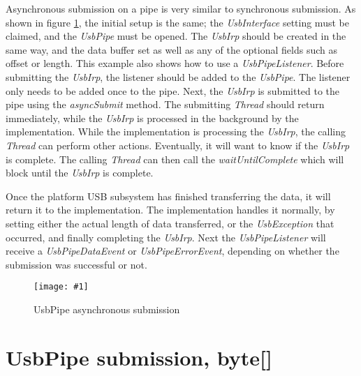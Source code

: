 \documentclass{article}
\newcommand{\myclass}[1]{\emph{#1}}
\newcommand{\myinterface}[1]{\emph{#1}}
\newcommand{\mymethod}[1]{\emph{#1}}
\newcommand{\mysectionend}[0]{\vfill\pagebreak[1]}
\newcommand{\myfigure}[3]{\begin{figure}[htbp]\centering\texttt{[image: \#1]}\caption{#2}\label{#3}\end{figure}}
\begin{document}
Asynchronous submission on a pipe is very similar to synchronous submission.
As shown in figure \ref{UsbPipeAsync}, the initial setup is the same; the
\myinterface{UsbInterface} setting must be claimed, and the \myinterface{UsbPipe} must be opened.  The
\myinterface{UsbIrp} should be created in the same way, and the data buffer set as well
as any of the optional fields such as offset or length.  This example also
shows how to use a \myinterface{UsbPipeListener}.  Before submitting the \myinterface{UsbIrp}, the
listener should be added to the \myinterface{UsbPipe}.  The listener only needs to be added
once to the pipe.  Next, the \myinterface{UsbIrp} is submitted to the pipe using the
\mymethod{asyncSubmit} method.  The submitting \myclass{Thread} should return
immediately, while the \myinterface{UsbIrp} is processed in the background by the implementation.
While the implementation is processing the \myinterface{UsbIrp}, the calling \myclass{Thread} can perform
other actions.  Eventually, it will want to know if the \myinterface{UsbIrp} is complete.  The
calling \myclass{Thread} can then call the \mymethod{waitUntilComplete} which will block
until the \myinterface{UsbIrp} is complete.  

Once the platform USB subsystem has finished transferring the data, it will return
it to the implementation.  The implementation handles it normally, by setting
either the actual length of data transferred, or the \myclass{UsbException} that occurred,
and finally completing the \myinterface{UsbIrp}.  Next the \myinterface{UsbPipeListener} will receive a
\myclass{UsbPipeDataEvent} or \myclass{UsbPipeErrorEvent}, depending on whether the submission was
successful or not.

\myfigure{figs/UsbPipeAsync}{UsbPipe asynchronous submission}{UsbPipeAsync}

\mysectionend

%

\section{UsbPipe submission, byte[]}
\end{document}
